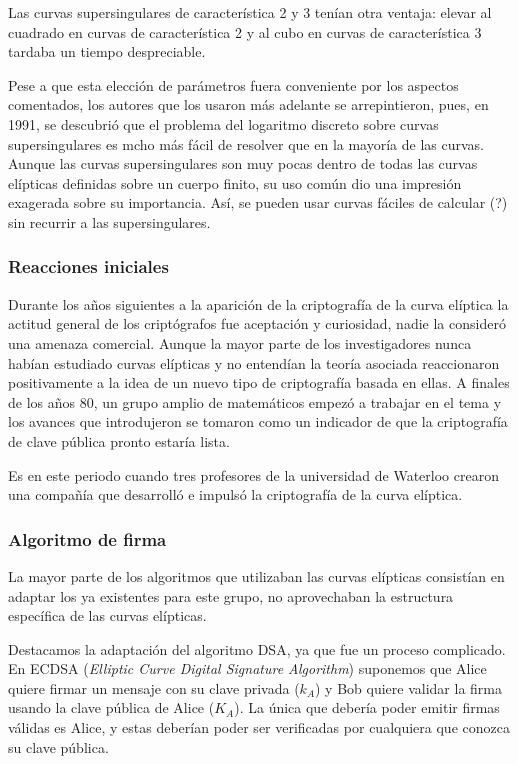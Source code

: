 \documentclass[
  a4paper,
  12pt,
  spanish,
]{scrartcl}
\begin{document}
Las curvas supersingulares de característica 2 y 3 tenían otra ventaja: elevar al cuadrado en curvas de característica 2 y al cubo en curvas de característica 3 tardaba un tiempo despreciable.

Pese a que esta elección de parámetros fuera conveniente por los aspectos comentados, los autores que los usaron más adelante se arrepintieron, pues, en 1991, se descubrió que el problema del logaritmo discreto sobre curvas supersingulares es mcho más fácil de resolver que en la mayoría de las curvas. Aunque las curvas supersingulares son muy pocas dentro de todas las curvas elípticas definidas sobre un cuerpo finito, su uso común dio una impresión exagerada sobre su importancia. Así, se pueden usar curvas fáciles de calcular (?)  sin recurrir a las supersingulares.

\subsubsection{Reacciones iniciales}
Durante los años siguientes a la aparición de la criptografía de la curva elíptica la actitud general de los criptógrafos fue aceptación y curiosidad, nadie la consideró una amenaza comercial. Aunque la mayor parte de los investigadores nunca habían estudiado curvas elípticas y no entendían la teoría asociada reaccionaron positivamente a la idea de un nuevo tipo de criptografía basada en ellas. A finales de los años 80, un grupo amplio de matemáticos empezó a trabajar en el tema y los avances que introdujeron se tomaron como un indicador de que la criptografía de clave pública pronto estaría lista.

Es en este periodo cuando tres profesores de la universidad de Waterloo crearon una compañía que desarrolló e impulsó la criptografía de la curva elíptica. 


\subsubsection{Algoritmo de firma}

La mayor parte de los algoritmos que utilizaban las curvas elípticas consistían en adaptar los ya existentes para este grupo, no aprovechaban la estructura específica de las curvas elípticas.

Destacamos la adaptación del algoritmo DSA, ya que fue un proceso complicado. En ECDSA (\textit{Elliptic Curve Digital Signature Algorithm}) suponemos que Alice quiere firmar un mensaje con su clave privada ($k_A$) y Bob quiere validar la firma usando la clave pública de Alice ($K_A$). La única que debería poder emitir firmas válidas es Alice, y estas deberían poder ser verificadas por cualquiera que conozca su clave pública.
\end{document}

